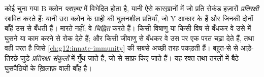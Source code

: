\begin{proposition}[B लसीकाणु और प्रतिरक्षी]\label{prop:g12:adaptive-immunity:antibodies}
कोई चुना गया B क्लोन \emph{प्लाज़्मा } में विभेदित होता है, यानी
ऐसे कारख़ानों में जो प्रति सेकंड हज़ारों \emph{प्रतिरक्षी}
स्रावित करते हैं: यानी उस क्लोन के ग्राही की घुलनशील प्रतियाँ, जो Y आकार के
 हैं और जिनकी दोनों बाँहें उस  से बँधती हैं।  मारते
नहीं; वे \emph{चिह्नित} करते हैं। किसी विषाणु या किसी विष से बँधकर वे उसे
 में घुसने या काम करने से रोक देते हैं; और किसी जीवाणु से बँधकर वे
उस पर एक परत चढ़ा देते हैं, तथा वही परत है जिसे
\cref{ch:g12:innate-immunity} की  सबसे अच्छी तरह पकड़ती हैं।
बहुत-से  से आड़े-तिरछे जुड़े  \emph{प्रतिरक्षा संकुलों}
में गुँथ जाते हैं, जो  से साफ़ किए जाते हैं। यह रक्त तथा तरलों
में बैठे घुसपैठियों के ख़िलाफ़ वाली बाँह है।
\end{proposition}
\admitted

